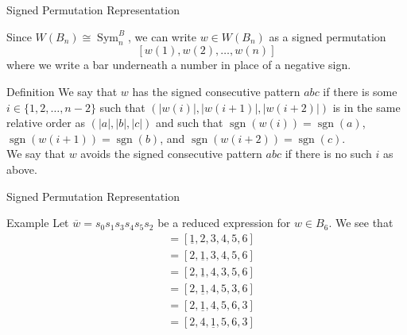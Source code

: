 \documentclass{beamer}
\newcommand{\w}{\overline{w}}
\DeclareMathOperator{\sgn}{sgn}
\DeclareMathOperator{\Sym}{Sym}
\begin{document}
\begin{frame}{Signed Permutation Representation}

Since $W(B_n) \cong \Sym_n^B$, we can write $w \in W(B_n)$ as a signed permutation 
\[[w(1), w(2), \ldots, w(n)]\] where we write a bar underneath a number in place of a negative sign.

\pause

\begin{block}{Definition}
	We say that $w$ has the \alert{signed consecutive pattern $abc$} if there is some $i \in \{1,2, \ldots, n-2\}$ such that $\left(|w(i)|, |w(i+1)|, |w(i+2)|\right)$ is in the same relative order as $\left(|a|, |b|, |c| \right)$ and such that $\sgn(w(i))=\sgn(a)$, $\sgn(w(i+1))=\sgn(b)$, and $\sgn(w(i+2))=\sgn(c)$.\\
	\vspace{1em} \pause
	 We say that $w$ \alert{avoids the signed consecutive pattern $abc$} if there is no such $i$ as above.
\end{block}

\end{frame}



\begin{frame}{Signed Permutation Representation}

\begin{block}{Example}
	Let $\w=s_0s_1s_3s_4s_5s_2$ be a reduced expression for $w \in B_6$. We see that
	\begin{align*}
	[1,2,3,4,5,6] &= [\underline{1},2,3,4,5,6]\\
	&=[2,\underline{1},3,4,5,6]\\	
	&=[2,\underline{1},4,3,5,6]\\
	&=[2,\underline{1},4,5,3,6]\\
	&=[2,\underline{1},4,5,6,3]\\
	&=[2,4,\underline{1},5,6,3]
	\end{align*}

\end{block}
	
\end{frame}


\end{document}
